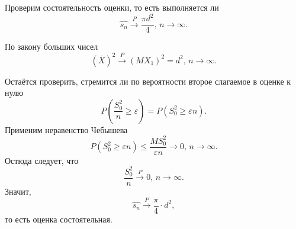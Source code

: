 Проверим состоятельность оценки, то есть выполняется ли
$$ \hat{s_n} \overset{P}{ \to } \frac{ \pi d^2}{4}, \,
  n \to \infty.$$

По закону больших чисел
$$ \left( \overline{X} \right)^2 \overset{P}{ \to } \left( MX_1 \right)^2 = d^2, \,
  n \to \infty.$$

Остаётся проверить, стремится ли по вероятности второе слагаемое в оценке к нулю
$$P \left( \frac{S_0^2}{n} \geq \varepsilon \right) =
  P \left( S_0^2 \geq \varepsilon n \right).$$
Применим неравенство Чебышева
$$P \left( S_0^2 \geq \varepsilon n \right) \leq
  \frac{MS_0^2}{ \varepsilon n} \to 0, \,
  n \to \infty.$$
Остюда следует, что
$$ \frac{S_0^2}{n} \overset{P}{ \to } 0, \, n \to \infty.$$
Значит,
$$ \hat{s_n} \overset{P}{ \to } \frac{ \pi }{4} \cdot d^2,$$
то есть оценка состоятельная.
